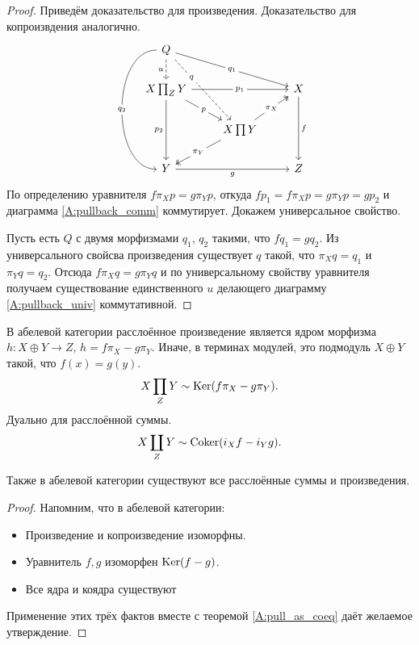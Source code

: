 \documentclass[../hw_main.tex]{subfiles}
\begin{document}
\begin{proof}
Приведём доказательство для произведения. Доказательство для копроизвдения аналогично.
\begin{equation*}
\begin{tikzcd}
	Q \\
	{X\prod_Z Y} && X \\
	& {X\prod Y} \\
	Y && Z
	\arrow["g"', from=4-1, to=4-3]
	\arrow["f", from=2-3, to=4-3]
	\arrow["{\pi_X}"{description}, two heads, from=3-2, to=2-3]
	\arrow["{\pi_Y}"{description}, two heads, from=3-2, to=4-1]
	\arrow["p"{description}, from=2-1, to=3-2]
	\arrow["{p_1}"{description}, from=2-1, to=2-3]
	\arrow["{p_2}"', from=2-1, to=4-1]
	\arrow["{q_1}"{description}, from=1-1, to=2-3]
	\arrow["{q_2}"{description}, bend right=90, from=1-1, to=4-1]
	\arrow["q"{description, pos=0.3}, dashed, from=1-1, to=3-2]
	\arrow["u"', dashed, from=1-1, to=2-1]
\end{tikzcd}
\end{equation*}
По определению уравнителя $f\pi_Xp = g\pi_Yp$, откуда $fp_1 = f\pi_X p = g\pi_Yp = gp_2$ и диаграмма \eqref{A:pullback_comm} коммутирует. Докажем универсальное свойство.

Пусть есть $Q$ с двумя морфизмами $q_1$, $q_2$ такими, что $fq_1 = gq_2$. Из универсального свойсва произведения существует $q$ такой, что $\pi_X q = q_1$ и $\pi_Y q = q_2$. Отсюда $f\pi_X q = g\pi_Y q$ и по универсальному свойству уравнителя получаем существование единственного $u$ делающего диаграмму \eqref{A:pullback_univ} коммутативной.
\end{proof}
\newpage
\begin{to_con}\label{A:pull_in_ab}
В абелевой категории расслоённое произведение является ядром морфизма $h:X\oplus Y \to Z$, $h = f\pi_X - g\pi_Y$. Иначе, в терминах модулей, это подмодуль $X\oplus Y$ такой, что $f(x) = g(y)$.
\begin{equation*}
    X\prod_Z Y \sim \mathop{\mathrm{Ker}}\nolimits(f\pi_X - g\pi_Y).
\end{equation*}
Дуально для расслоённой суммы.
\begin{equation*}
X\coprod_Z Y \sim \operatorname{Coker}(i_X f - i_Y g).
\end{equation*}

Также в абелевой категории существуют все расслоённые суммы и произведения.
\end{to_con}
\begin{proof}
    Напомним, что в абелевой категории:
    \begin{itemize}
        \item Произведение и копроизведение изоморфны.
        \item Уравнитель $f, g$ изоморфен $\mathop{\mathrm{Ker}}\nolimits (f-g)$.
        \item Все ядра и коядра существуют
    \end{itemize}
    Применение этих трёх фактов вместе с теоремой \ref{A:pull_as_coeq} даёт желаемое утверждение.
\end{proof}
\end{document}
